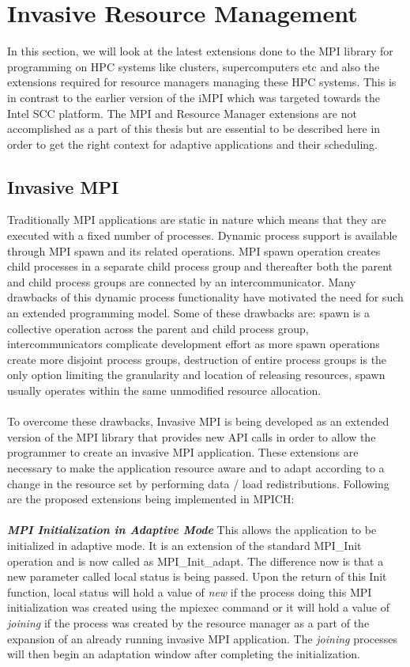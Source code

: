 \section{Invasive Resource Management}
In this section, we will look at the latest extensions done to the MPI library for programming on HPC systems like clusters, supercomputers etc and also the extensions required for resource managers managing these HPC systems. This is in contrast to the earlier version of the iMPI which was targeted towards the Intel SCC platform. The MPI and Resource Manager extensions are not accomplished as a part of this thesis but are essential to be described here in order to get the right context for adaptive applications and their scheduling.
\subsection{Invasive MPI}
Traditionally MPI applications are static in nature which means that they are executed with a fixed number of processes. Dynamic process support is available through MPI spawn and its related operations. MPI spawn operation creates child processes in a separate child process group and thereafter both the parent and child process groups are connected by an intercommunicator. Many drawbacks of this dynamic process functionality have motivated the need for such an extended programming model. Some of these drawbacks are: spawn is a collective operation across the parent and child process group, intercommunicators complicate development effort as more spawn operations create more disjoint process groups, destruction of entire process groups is the only option limiting the granularity and location of releasing resources, spawn usually operates within the same unmodified resource allocation.\\ \\
To overcome these drawbacks, Invasive MPI is being developed as an extended version of the MPI library that provides new API calls in order to allow the programmer to create an invasive MPI application. These extensions are necessary to make the application resource aware and to adapt according to a change in the resource set by performing data / load redistributions. Following are the proposed extensions being implemented in MPICH:\\ \\
\textbf{\textit{MPI Initialization in Adaptive Mode}} This allows the application to be initialized in adaptive mode. It is an extension of the standard MPI{\_}Init operation and is now called as MPI{\_}Init{\_}adapt. The difference now is that a new parameter called local status is being passed. Upon the return of this Init function, local status will hold a value of \textit{new} if the process doing this MPI initialization was created using the mpiexec command or it will hold a value of \textit{joining} if the process was created by the resource manager as a part of the expansion of an already running invasive MPI application. The \textit{joining} processes will then begin an adaptation window after completing the initialization. 
